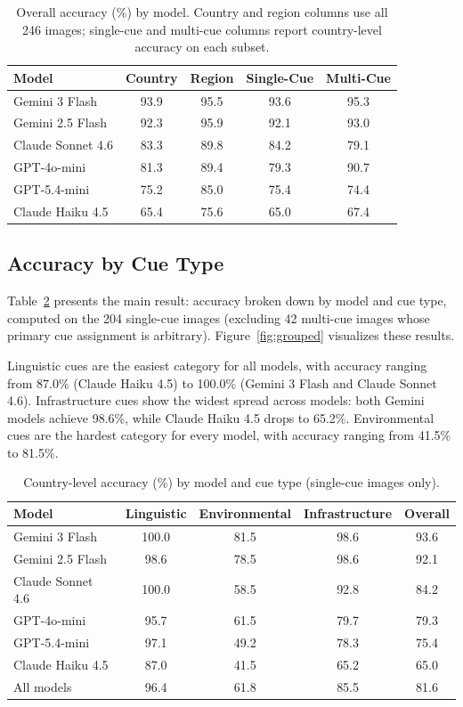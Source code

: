 \documentclass[twoside,11pt]{article}
\begin{document}
\begin{table}[t]
\caption{Overall accuracy (\%) by model. Country and region columns use all 246 images; single-cue and multi-cue columns report country-level accuracy on each subset.}
\label{tab:overall}
\centering
\small
\begin{tabular}{lcccc}
\toprule
\textbf{Model} & \textbf{Country} & \textbf{Region} & \textbf{Single-Cue} & \textbf{Multi-Cue} \\
\midrule
Gemini 3 Flash     & 93.9 & 95.5 & 93.6 & 95.3 \\
Gemini 2.5 Flash   & 92.3 & 95.9 & 92.1 & 93.0 \\
Claude Sonnet 4.6  & 83.3 & 89.8 & 84.2 & 79.1 \\
GPT-4o-mini        & 81.3 & 89.4 & 79.3 & 90.7 \\
GPT-5.4-mini       & 75.2 & 85.0 & 75.4 & 74.4 \\
Claude Haiku 4.5   & 65.4 & 75.6 & 65.0 & 67.4 \\
\bottomrule
\end{tabular}
\end{table}

\subsection{Accuracy by Cue Type}

Table~\ref{tab:main} presents the main result: accuracy broken down by model and cue type, computed on the 204 single-cue images (excluding 42 multi-cue images whose primary cue assignment is arbitrary). Figure~\ref{fig:grouped} visualizes these results.

Linguistic cues are the easiest category for all models, with accuracy ranging from 87.0\% (Claude Haiku 4.5) to 100.0\% (Gemini 3 Flash and Claude Sonnet 4.6). Infrastructure cues show the widest spread across models: both Gemini models achieve 98.6\%, while Claude Haiku 4.5 drops to 65.2\%. Environmental cues are the hardest category for every model, with accuracy ranging from 41.5\% to 81.5\%.

\begin{table}[t]
\caption{Country-level accuracy (\%) by model and cue type (single-cue images only).}
\label{tab:main}
\centering
\small
\begin{tabular}{lcccc}
\toprule
\textbf{Model} & \textbf{Linguistic} & \textbf{Environmental} & \textbf{Infrastructure} & \textbf{Overall} \\
\midrule
Gemini 3 Flash     & 100.0 & 81.5 & 98.6 & 93.6 \\
Gemini 2.5 Flash   & 98.6 & 78.5 & 98.6 & 92.1 \\
Claude Sonnet 4.6  & 100.0 & 58.5 & 92.8 & 84.2 \\
GPT-4o-mini        & 95.7 & 61.5 & 79.7 & 79.3 \\
GPT-5.4-mini       & 97.1 & 49.2 & 78.3 & 75.4 \\
Claude Haiku 4.5   & 87.0 & 41.5 & 65.2 & 65.0 \\
\midrule
All models         & 96.4 & 61.8 & 85.5 & 81.6 \\
\bottomrule
\end{tabular}
\end{table}
\end{document}
